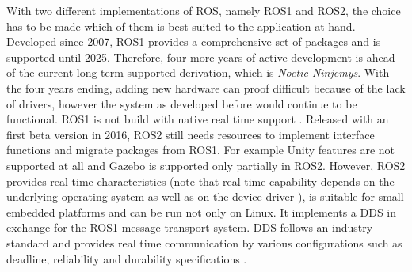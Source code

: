 With two different implementations of  \ac{ROS}, namely ROS1 and ROS2, the choice has to be made which of them is best suited to the application at hand. Developed since 2007, ROS1 provides a comprehensive set of packages \cite{ROSExample} and is supported until 2025. Therefore, four more years of active development is ahead of the current long term supported derivation, which is \textit{Noetic Ninjemys}. With the four years ending, adding new hardware can proof difficult because of the lack of drivers, however the system as developed before would continue to be functional. ROS1 is not build with native real time support \cite{ROSPerform}. Released with an first beta version in 2016, ROS2 still needs resources to implement interface functions and migrate packages from ROS1. For example Unity features are not supported at all and Gazebo is supported only partially in ROS2. However, ROS2 provides real time characteristics (note that real time capability depends on the underlying operating system as well as on the device driver \cite{ROSRealtime}), is suitable for small embedded platforms and can be run not only on Linux. It implements a \ac{DDS} in exchange for the ROS1 message transport system. \ac{DDS} follows an industry standard and provides real time communication by various configurations such as deadline, reliability and durability specifications \cite{ROSDDS}.\\

